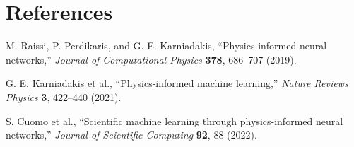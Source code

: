 \documentclass[11pt]{article}
\begin{document}
\section{References}
\begin{enumerate}[label={[\arabic*]}]
\item M. Raissi, P. Perdikaris, and G. E. Karniadakis, ``Physics-informed neural networks,'' \emph{Journal of Computational Physics} \textbf{378}, 686--707 (2019).
\item G. E. Karniadakis et al., ``Physics-informed machine learning,'' \emph{Nature Reviews Physics} \textbf{3}, 422--440 (2021).
\item S. Cuomo et al., ``Scientific machine learning through physics-informed neural networks,'' \emph{Journal of Scientific Computing} \textbf{92}, 88 (2022).
\end{enumerate}
\end{document}
